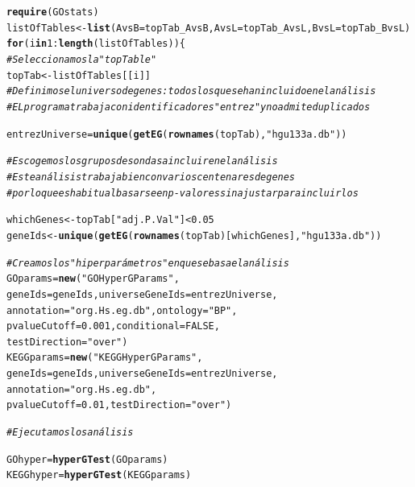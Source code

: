\documentclass[a4paper]{article}\usepackage[]{graphicx}\usepackage[]{color}
\makeatletter
\newcommand{\hlnum}[1]{\textcolor[rgb]{0.686,0.059,0.569}{#1}}%
\newcommand{\hlstr}[1]{\textcolor[rgb]{0.192,0.494,0.8}{#1}}%
\newcommand{\hlcom}[1]{\textcolor[rgb]{0.678,0.584,0.686}{\textit{#1}}}%
\newcommand{\hlopt}[1]{\textcolor[rgb]{0,0,0}{#1}}%
\newcommand{\hlstd}[1]{\textcolor[rgb]{0.345,0.345,0.345}{#1}}%
\newcommand{\hlkwa}[1]{\textcolor[rgb]{0.161,0.373,0.58}{\textbf{#1}}}%
\newcommand{\hlkwb}[1]{\textcolor[rgb]{0.69,0.353,0.396}{#1}}%
\newcommand{\hlkwc}[1]{\textcolor[rgb]{0.333,0.667,0.333}{#1}}%
\newcommand{\hlkwd}[1]{\textcolor[rgb]{0.737,0.353,0.396}{\textbf{#1}}}%
\newenvironment{kframe}{%
 \def\at@end@of@kframe{}%
 \ifinner\ifhmode%
  \def\at@end@of@kframe{\end{minipage}}%
  \begin{minipage}{\columnwidth}%
 \fi\fi%
 \def\FrameCommand##1{\hskip\@totalleftmargin \hskip-\fboxsep
 \colorbox{shadecolor}{##1}\hskip-\fboxsep
     \hskip-\linewidth \hskip-\@totalleftmargin \hskip\columnwidth}%
 \MakeFramed {\advance\hsize-\width
   \@totalleftmargin\z@ \linewidth\hsize
   \@setminipage}}%
 {\par\unskip\endMakeFramed%
 \at@end@of@kframe}
\newenvironment{knitrout}{}{} %
\makeatother
\begin{document}
\begin{knitrout}
\color{fgcolor}\begin{kframe}
\begin{alltt}
\hlkwd{require}\hlstd{(GOstats)}
\hlstd{listOfTables} \hlkwb{<-} \hlkwd{list}\hlstd{(}\hlkwc{AvsB} \hlstd{= topTab_AvsB,} \hlkwc{AvsL} \hlstd{= topTab_AvsL,} \hlkwc{BvsL} \hlstd{= topTab_BvsL)}
\hlkwa{for} \hlstd{(i} \hlkwa{in} \hlnum{1}\hlopt{:}\hlkwd{length}\hlstd{(listOfTables))\{}
  \hlcom{# Seleccionamos la "topTable"}
  \hlstd{topTab} \hlkwb{<-} \hlstd{listOfTables[[i]]}
  \hlcom{# Definimos el universo de genes: todos los que se han incluido en el análisis}
  \hlcom{# EL programa trabaja con identificadores "entrez" y no admite duplicados}

  \hlstd{entrezUniverse} \hlkwb{=} \hlkwd{unique}\hlstd{(}\hlkwd{getEG}\hlstd{(}\hlkwd{rownames}\hlstd{(topTab),} \hlstr{"hgu133a.db"}\hlstd{))}

  \hlcom{# Escogemos los grupos de sondas a incluir en el análisis}
  \hlcom{# Este análisis trabaja bien con varios centenares de genes }
  \hlcom{# por lo que es habitual basarse en p-valores sin ajustar para incluirlos}

  \hlstd{whichGenes}\hlkwb{<-}\hlstd{topTab[}\hlstr{"adj.P.Val"}\hlstd{]}\hlopt{<}\hlnum{0.05}
  \hlstd{geneIds} \hlkwb{<-}   \hlkwd{unique}\hlstd{(}\hlkwd{getEG}\hlstd{(}\hlkwd{rownames}\hlstd{(topTab)[whichGenes],}\hlstr{"hgu133a.db"}\hlstd{))}

  \hlcom{# Creamos los "hiperparámetros" en que se basa el análisis}
  \hlstd{GOparams} \hlkwb{=} \hlkwd{new}\hlstd{(}\hlstr{"GOHyperGParams"}\hlstd{,}
    \hlkwc{geneIds}\hlstd{=geneIds,} \hlkwc{universeGeneIds}\hlstd{=entrezUniverse,}
    \hlkwc{annotation}\hlstd{=}\hlstr{"org.Hs.eg.db"}\hlstd{,} \hlkwc{ontology}\hlstd{=}\hlstr{"BP"}\hlstd{,}
    \hlkwc{pvalueCutoff}\hlstd{=}\hlnum{0.001}\hlstd{,} \hlkwc{conditional}\hlstd{=}\hlnum{FALSE}\hlstd{,}
    \hlkwc{testDirection}\hlstd{=}\hlstr{"over"}\hlstd{)}
  \hlstd{KEGGparams} \hlkwb{=} \hlkwd{new}\hlstd{(}\hlstr{"KEGGHyperGParams"}\hlstd{,}
    \hlkwc{geneIds}\hlstd{=geneIds,} \hlkwc{universeGeneIds}\hlstd{=entrezUniverse,}
    \hlkwc{annotation}\hlstd{=}\hlstr{"org.Hs.eg.db"}\hlstd{,}
    \hlkwc{pvalueCutoff}\hlstd{=}\hlnum{0.01}\hlstd{,} \hlkwc{testDirection}\hlstd{=}\hlstr{"over"}\hlstd{)}

  \hlcom{# Ejecutamos los análisis}

  \hlstd{GOhyper} \hlkwb{=} \hlkwd{hyperGTest}\hlstd{(GOparams)}
  \hlstd{KEGGhyper} \hlkwb{=} \hlkwd{hyperGTest}\hlstd{(KEGGparams)}


\end{alltt}
\end{kframe}
\end{knitrout}
\end{document}
